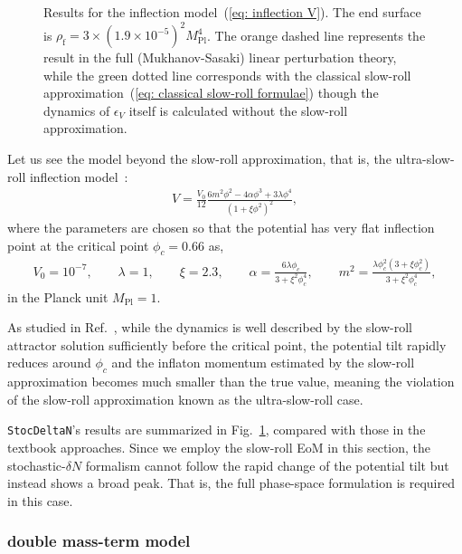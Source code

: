 \documentclass[aps, prd
, preprint
, nofootinbib 
, longbibliography
]{revtex4-1}
\newcommand{\Mpl}{M_\text{Pl}}
\newcommand{\uf}{\text{f}}
\newcommand{\bae}[1]{\begin{align} #1 \end{align}}
\begin{document}
\begin{figure}
	\caption{Results for the inflection model~(\ref{eq: inflection V}). The end surface is $\rho_\uf=3\times(1.9\times10^{-5})^2\Mpl^4$. 
	The orange dashed line represents the result in the full (Mukhanov-Sasaki) linear perturbation theory,
	while the green dotted line corresponds with the classical slow-roll approximation~(\ref{eq: classical slow-roll formulae}) though the dynamics of $\epsilon_V$ itself is
	calculated without the slow-roll approximation.}
	\label{figs: inflection_conf}
\end{figure}

Let us see the model beyond the slow-roll approximation, that is, the ultra-slow-roll inflection model~\cite{Garcia-Bellido:2017mdw,Ezquiaga:2018gbw}:
\bae{\label{eq: inflection V}
	V=\frac{V_0}{12}\frac{6m^2\phi^2-4\alpha\phi^3+3\lambda\phi^4}{(1+\xi\phi^2)^2},
}
where the parameters are chosen so that the potential has very flat inflection point at the critical point $\phi_c=0.66$ as,
\bae{
	V_0=10^{-7}, \qquad \lambda=1, \qquad \xi=2.3, \qquad \alpha=\frac{6\lambda\phi_c}{3+\xi^2\phi_c^4}, \qquad m^2=\frac{\lambda\phi_c^2(3+\xi\phi_c^2)}{3+\xi^2\phi_c^4},
}
in the Planck unit $\Mpl=1$.

As studied in Ref.~\cite{Garcia-Bellido:2017mdw}, while the dynamics is well described by the slow-roll attractor solution sufficiently before the critical point,
the potential tilt rapidly reduces around $\phi_c$ and the inflaton momentum estimated by the slow-roll approximation becomes much smaller than the true value,
meaning the violation of the slow-roll approximation known as the ultra-slow-roll case.

\texttt{StocDeltaN}'s results are summarized in Fig.~\ref{figs: inflection_conf}, compared with those in the textbook approaches.
Since we employ the slow-roll EoM in this section, the stochastic-$\delta N$ formalism cannot follow the rapid change of the potential tilt but instead
shows a broad peak. That is, the full phase-space formulation is required in this case.




\subsubsection{double mass-term model}
\end{document}
